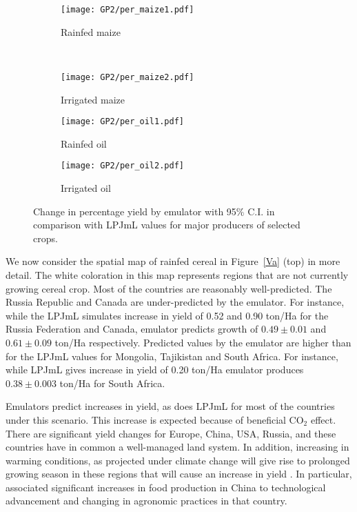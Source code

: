 \begin{figure}[!htb]
\begin{subfigure}[b]{\textwidth}
\centering
\texttt{[image: GP2/per\_maize1.pdf]}
\caption{Rainfed maize}
\label{per1b}
\end{subfigure}\\
\begin{subfigure}[b]{\textwidth}
\centering
\texttt{[image: GP2/per\_maize2.pdf]}
\caption{Irrigated maize}
\label{per2b}
\end{subfigure}
\begin{subfigure}[b]{\textwidth}
\centering
\texttt{[image: GP2/per\_oil1.pdf]}
\caption{Rainfed oil}
\label{per3b}
\end{subfigure}
\begin{subfigure}[b]{\textwidth}
\centering
\texttt{[image: GP2/per\_oil2.pdf]}
\caption{Irrigated oil}
\label{per4b}
\end{subfigure}
\caption{Change in percentage yield by emulator with 95\% C.I. in comparison with LPJmL values for major producers of selected crops.}
\end{figure}

We now consider the spatial map of rainfed cereal in Figure~\ref{Va} (top) in more detail.  The white coloration in this map represents regions that are not currently growing cereal crop. Most of the countries are reasonably well-predicted. The Russia Republic and Canada are under-predicted by the emulator. For instance, while the LPJmL simulates increase in yield of 0.52 and 0.90 ton/Ha for the Russia Federation and Canada, emulator predicts growth of $0.49\pm0.01 $ and $0.61\pm0.09$ ton/Ha respectively. Predicted values by the emulator are higher than for the LPJmL values for Mongolia, Tajikistan and South Africa. For instance, while LPJmL gives increase in yield of 0.20 ton/Ha emulator produces $0.38\pm 0.003$ ton/Ha for South Africa.

Emulators predict increases in yield, as does LPJmL for most of the countries under this scenario. This increase is expected because of beneficial CO$_2$ effect. There are significant yield changes for Europe, China, USA, Russia, and these countries have in common a well-managed land system. In addition, increasing in warming conditions, as projected under climate change will give rise to prolonged growing season in these regions that will cause an increase in yield \citep{q88,q85,q91}. In particular, \cite{q90} associated significant increases in food production in China to technological advancement and changing in agronomic practices in that country.

